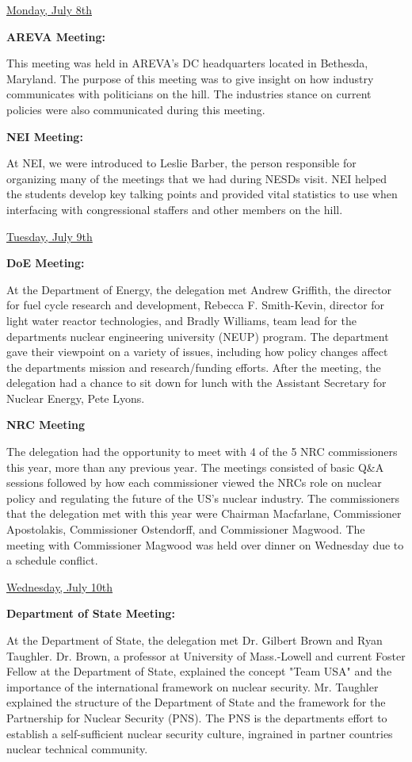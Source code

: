 \documentclass[12pt]{article}
\begin{document}
\underline{Monday, July 8th}

\textbf{AREVA Meeting:} 

This meeting was held in AREVA's DC headquarters located in Bethesda,
Maryland. The purpose of this meeting was to give insight on how industry
communicates with politicians on the hill. The industries stance on current
policies were also communicated during this meeting.

\textbf{NEI Meeting:} 

At NEI, we were introduced to Leslie Barber, the person responsible for
organizing many of the meetings that we had during NESDs visit. NEI helped the
students develop key talking points and provided vital statistics to use when
interfacing with congressional staffers and other members on the hill.

\underline{Tuesday, July 9th}

\textbf{DoE Meeting:}

At the Department of Energy, the delegation met Andrew Griffith, the director
for fuel cycle research and development, Rebecca F. Smith-Kevin, director for
light water reactor technologies, and Bradly Williams, team lead for the
departments nuclear engineering university (NEUP) program. The department gave
their viewpoint on a variety of issues, including how policy changes affect the
departments mission and research/funding efforts. After the meeting, the
delegation had a chance to sit down for lunch with the Assistant Secretary for
Nuclear Energy, Pete Lyons.

\textbf{NRC Meeting}

The delegation had the opportunity to meet with 4 of the 5 NRC commissioners
this year, more than any previous year. The meetings consisted of basic Q\&A
sessions followed by how each commissioner viewed the NRCs role on nuclear
policy and regulating the future of the US's nuclear industry. The commissioners
that the delegation met with this year were Chairman Macfarlane, Commissioner
Apostolakis, Commissioner Ostendorff, and Commissioner Magwood. The meeting with
Commissioner Magwood was held over dinner on Wednesday due to a schedule
conflict.

\underline{Wednesday, July 10th}

\textbf{Department of State Meeting:}

At the Department of State, the delegation met Dr. Gilbert Brown and Ryan
Taughler. Dr. Brown, a professor at University of Mass.-Lowell and current
Foster Fellow at the Department of State, explained the concept "Team USA" and
the importance of the international framework on nuclear security. Mr. Taughler
explained the structure of the Department of State and the framework for the
Partnership for Nuclear Security (PNS). The PNS is the departments effort to
establish a self-sufficient nuclear security culture, ingrained in partner
countries nuclear technical community.
\end{document}
